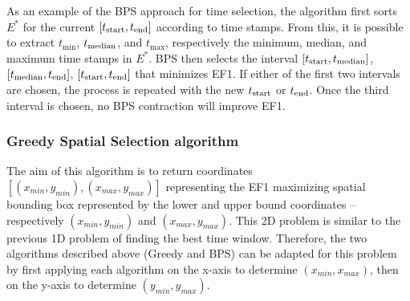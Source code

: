 As an example of the BPS approach for time selection, the algorithm first sorts $E^*$ for the current $[t_{\textrm{start}},t_{\textrm{end}}]$ according to time stamps.  From this, it is possible to extract $t_{\min}$, $t_{\textrm{median}}$, and $t_{\max}$, respectively the minimum, median, and maximum time stamps in $E^*$.
BPS then selects the interval  $[t_{\textrm{start}},t_{\textrm{median}}]$, $[t_{\textrm{median}},t_{\textrm{end}}]$, $[t_{\textrm{start}},t_{\textrm{end}}]$ that minimizes EF1.  If either of the first two intervals are chosen, the process is repeated with the new $t_{\textrm{start}}$ or $t_{\textrm{end}}$.  Once the third interval is chosen, no BPS contraction will improve EF1. 




\subsubsection{Greedy Spatial Selection algorithm}

The aim of this algorithm is to return coordinates $[(x_{min},y_{min}),(x_{max},y_{max})]$ representing the EF1 maximizing spatial bounding box represented by the lower and upper bound coordinates -- respectively $(x_{min},y_{min})$ and $(x_{max},y_{max})$. This 2D problem is similar to the previous 1D problem of finding the best time window. Therefore, the two algorithms described above (Greedy and BPS) can be adapted for this problem by first applying each algorithm on the x-axis to determine $(x_{min},x_{max})$, then on the y-axis to determine $(y_{min},y_{max})$. 


